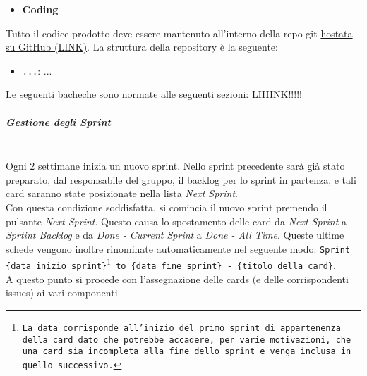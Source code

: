 \begin{itemize}
    \item \textbf{Coding}
\end{itemize}
Tutto il codice prodotto deve essere mantenuto all'interno della repo git \href{}{hostata su GitHub (LINK)}.
La struttura della repository è la seguente:
\begin{itemize}
    \item \texttt{...}: ...
\end{itemize}

Le seguenti bacheche sono normate alle seguenti sezioni: LIIIINK!!!!!

\subparagraph{Gestione degli Sprint}
\mbox{}\\
Ogni 2 settimane inizia un nuovo sprint. Nello sprint precedente sarà già stato preparato, dal responsabile del gruppo, il backlog per lo sprint in partenza, e tali card saranno state posizionate nella lista \textit{Next Sprint}. \\
Con questa condizione soddisfatta, si comincia il nuovo sprint premendo il pulsante \textit{Next Sprint}. Questo causa lo spostamento delle card da \textit{Next Sprint} a \textit{Sprtint Backlog} e da \textit{Done - Current Sprint} a \textit{Done - All Time}. Queste ultime schede vengono inoltre rinominate automaticamente nel seguente modo: \texttt{Sprint \{data inizio sprint\}\footnote{La data corrisponde all'inizio del primo sprint di appartenenza della card dato che potrebbe accadere, per varie motivazioni, che una card sia incompleta alla fine dello sprint e venga inclusa in quello successivo.} to \{data fine sprint\} - \{titolo della card\}}.\\
A questo punto si procede con l'assegnazione delle cards (e delle corrispondenti issues) ai vari componenti.


